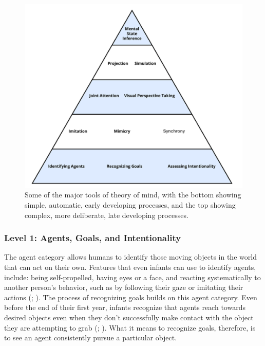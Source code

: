 \documentclass[
]{krantz}
\begin{document}
\begin{figure}

{\centering \includegraphics[width=1\linewidth]{images/ch7/fig6} 

}

\caption{Some of the major tools of theory of mind, with the bottom showing simple, automatic, early developing processes, and the top showing complex, more deliberate, late developing processes. }\label{fig:pyramid}
\end{figure}

\subsubsection*{Level 1: Agents, Goals, and Intentionality}\label{level-1-agents-goals-and-intentionality}


The agent category allows humans to identify those moving objects in the world that can act on their own. Features that even infants can use to identify agents, include: being self-propelled, having eyes or a face, and reacting systematically to another person's behavior, such as by following their gaze or imitating their actions (; ). The process of recognizing goals builds on this agent category. Even before the end of their first year, infants recognize that agents reach towards desired objects even when they don't successfully make contact with the object they are attempting to grab (; ). What it means to recognize goals, therefore, is to see an agent consistently pursue a particular object.
\end{document}
